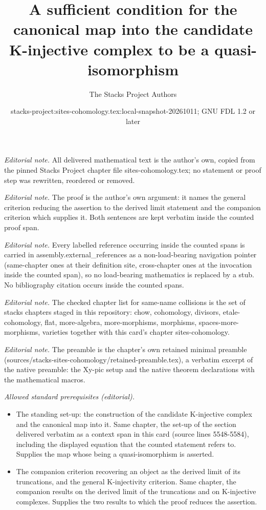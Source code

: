 \documentclass[10pt,a4paper]{amsart}
\title{A sufficient condition for the canonical map into the candidate K-injective complex to be a quasi-isomorphism}
\author{The Stacks Project Authors}
\date{stacks-project:sites-cohomology.tex:local-snapshot-20261011; GNU FDL 1.2 or later}
\theoremstyle{plain}
\theoremstyle{definition}
\theoremstyle{remark}
\numberwithin{equation}{subsection}
\begin{document}
\maketitle
\noindent\textit{Editorial note.} All delivered mathematical text is the author's own, copied from the pinned Stacks Project chapter file sites-cohomology.tex; no statement or proof step was rewritten, reordered or removed.\par\medskip
\noindent\textit{Editorial note.} The proof is the author's own argument: it names the general criterion reducing the assertion to the derived limit statement and the companion criterion which supplies it. Both sentences are kept verbatim inside the counted proof span.\par\medskip
\noindent\textit{Editorial note.} Every labelled reference occurring inside the counted spans is carried in assembly.external\_references as a non-load-bearing navigation pointer (same-chapter ones at their definition site, cross-chapter ones at the invocation inside the counted span), so no load-bearing mathematics is replaced by a stub. No bibliography citation occurs inside the counted spans.\par\medskip
\noindent\textit{Editorial note.} The checked chapter list for same-name collisions is the set of stacks chapters staged in this repository: chow, cohomology, divisors, etale-cohomology, flat, more-algebra, more-morphisms, morphisms, spaces-more-morphisms, varieties together with this card's chapter sites-cohomology.\par\medskip
\noindent\textit{Editorial note.} The preamble is the chapter's own retained minimal preamble (sources/stacks-sites-cohomology/retained-preamble.tex), a verbatim excerpt of the native preamble: the Xy-pic setup and the native theorem declarations with the mathematical macros.\par\medskip
\noindent\textit{Allowed standard prerequisites (editorial).}\begin{itemize}
\item The standing set-up: the construction of the candidate K-injective complex and the canonical map into it. Same chapter, the set-up of the section delivered verbatim as a context span in this card (source lines 5548-5584), including the displayed equation that the counted statement refers to. Supplies the map whose being a quasi-isomorphism is asserted.
\item The companion criterion recovering an object as the derived limit of its truncations, and the general K-injectivity criterion. Same chapter, the companion results on the derived limit of the truncations and on K-injective complexes. Supplies the two results to which the proof reduces the assertion.
\end{itemize}\medskip
\end{document}

